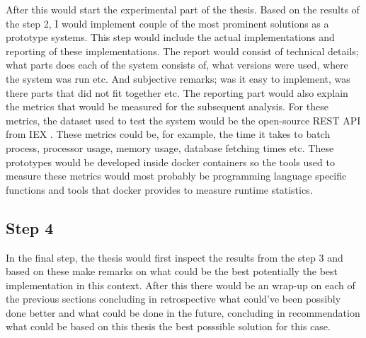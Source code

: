 \documentclass[article,11pt]{article}
\begin{document}
After this would start the experimental part of the thesis. Based on the results of the step 2, I would implement couple of the most prominent solutions as a prototype systems. This step would include the actual implementations and reporting of these implementations. The report would consist of technical details; what parts does each of the system consists of, what versions were used, where the system was run etc. And subjective remarks; was it easy to implement, was there parts that did not fit together etc. The reporting part would also explain the metrics that would be measured for the subsequent analysis. For these metrics, the dataset used to test the system would be the open-source REST API from IEX \cite{iex}. These metrics could be, for example, the time it takes to batch process, processor usage, memory usage, database fetching times etc. These prototypes would be developed inside docker containers so the tools used to measure these metrics would most probably be programming language specific functions and tools that docker provides to measure runtime statistics.

\subsection*{Step 4}

In the final step, the thesis would first inspect the results from the step 3 and based on these make remarks on what could be the best potentially the best implementation in this context. After this there would be an wrap-up on each of the previous sections concluding in retrospective what could've been possibly done better and what could be done in the future, concluding in recommendation what could be based on this thesis the best posssible solution for this case. 


\printbibliography
\end{document}
